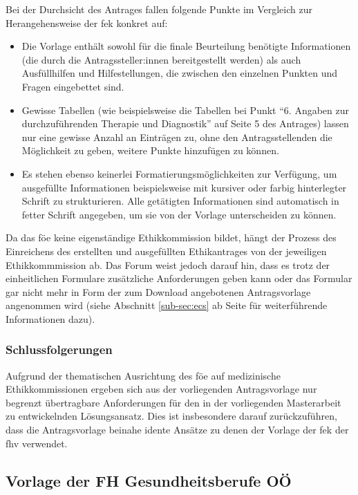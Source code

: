 \documentclass[a4paper,12pt,twoside]{scrreprt}
\begin{document}
Bei der Durchsicht des Antrages fallen folgende Punkte im Vergleich zur Herangehensweise der \ac{fek} konkret auf:
\begin{itemize}
    \item Die Vorlage enthält sowohl für die finale Beurteilung benötigte Informationen (die durch die Antragssteller:innen bereitgestellt werden) als auch Ausfüllhilfen und Hilfestellungen, die zwischen den einzelnen Punkten und Fragen eingebettet sind.
    \item Gewisse Tabellen (wie beispielsweise die Tabellen bei Punkt \enquote{6. Angaben zur durchzuführenden Therapie und Diagnostik} auf Seite 5 des Antrages) lassen nur eine gewisse Anzahl an Einträgen zu, ohne den Antragsstellenden die Möglichkeit zu geben, weitere Punkte hinzufügen zu können.
    \item Es stehen ebenso keinerlei Formatierungsmöglichkeiten zur Verfügung, um ausgefüllte Informationen beispielsweise mit kursiver oder farbig hinterlegter Schrift zu strukturieren. Alle getätigten Informationen sind automatisch in fetter Schrift angegeben, um sie von der Vorlage unterscheiden zu können.
\end{itemize}

Da das \ac{föe} keine eigenständige Ethikkommission bildet, hängt der Prozess des Einreichens des erstellten und ausgefüllten Ethikantrages von der jeweiligen Ethikkommmission ab. Das Forum weist jedoch darauf hin, dass es trotz der einheitlichen Formulare zusätzliche Anforderungen geben kann oder das Formular gar nicht mehr in Form der zum Download angebotenen Antragsvorlage angenommen wird (siehe Abschnitt \ref{sub-sec:ecs} ab Seite \pageref{sub-sec:ecs} für weiterführende Informationen dazu). \cite{ethikkommission_der_medizinischen_universitat_graz_download_2012}

\subsubsection*{Schlussfolgerungen}
\label{sub-sub-sec:schlussfolgerungen-föe}

Aufgrund der thematischen Ausrichtung des \acl{föe} auf medizinische Ethikkommissionen ergeben sich aus der vorliegenden Antragsvorlage nur begrenzt übertragbare Anforderungen für den in der vorliegenden Masterarbeit zu entwickelnden Lösungsansatz. Dies ist insbesondere darauf zurückzuführen, dass die Antragsvorlage beinahe idente Ansätze zu denen der Vorlage der \acl{fek} der \acl{fhv} verwendet.

\subsection{Vorlage der FH Gesundheitsberufe OÖ}
\label{sub-cec:vorlage-fh-oö}
\end{document}
